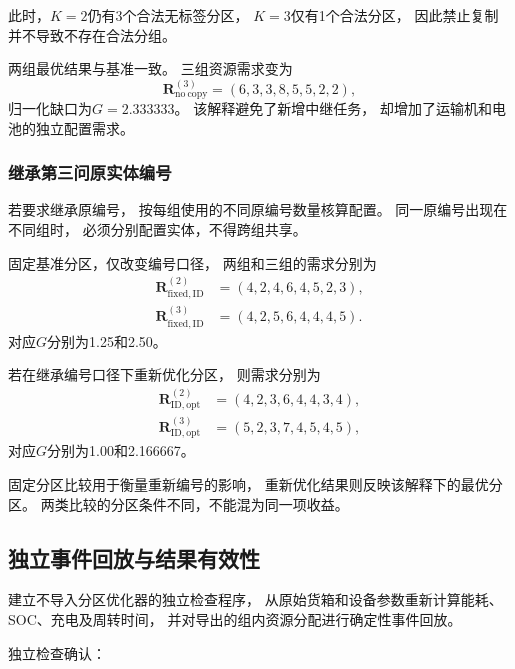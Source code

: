 \documentclass[bwprint]{gmcmthesis}
\begin{document}
此时，$K=2$仍有3个合法无标签分区，
$K=3$仅有1个合法分区，
因此禁止复制并不导致不存在合法分组。

两组最优结果与基准一致。
三组资源需求变为
\begin{equation}
\boldsymbol{R}^{(3)}_{\mathrm{no\ copy}}
=(6,3,3,8,5,5,2,2),
\end{equation}
归一化缺口为$G=2.333333$。
该解释避免了新增中继任务，
却增加了运输机和电池的独立配置需求。

\subsubsection{继承第三问原实体编号}

若要求继承原编号，
按每组使用的不同原编号数量核算配置。
同一原编号出现在不同组时，
必须分别配置实体，不得跨组共享。

固定基准分区，仅改变编号口径，
两组和三组的需求分别为
\begin{align}
\boldsymbol{R}^{(2)}_{\mathrm{fixed,ID}}
&=(4,2,4,6,4,5,2,3),\\
\boldsymbol{R}^{(3)}_{\mathrm{fixed,ID}}
&=(4,2,5,6,4,4,4,5).
\end{align}
对应$G$分别为1.25和2.50。

若在继承编号口径下重新优化分区，
则需求分别为
\begin{align}
\boldsymbol{R}^{(2)}_{\mathrm{ID,opt}}
&=(4,2,3,6,4,4,3,4),\\
\boldsymbol{R}^{(3)}_{\mathrm{ID,opt}}
&=(5,2,3,7,4,5,4,5),
\end{align}
对应$G$分别为1.00和2.166667。

固定分区比较用于衡量重新编号的影响，
重新优化结果则反映该解释下的最优分区。
两类比较的分区条件不同，不能混为同一项收益。

\subsection{独立事件回放与结果有效性}

建立不导入分区优化器的独立检查程序，
从原始货箱和设备参数重新计算能耗、SOC、充电及周转时间，
并对导出的组内资源分配进行确定性事件回放。

独立检查确认：
\end{document}
